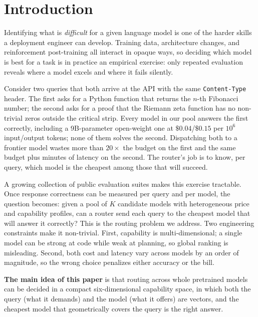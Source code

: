 \documentclass[twocolumn,10pt,a4paper]{article}
\begin{document}
\section{Introduction}\label{sec:intro}
Identifying what is \emph{difficult} for a given language model is one of the harder skills a deployment engineer can develop. Training data, architecture changes, and reinforcement post-training all interact in opaque ways, so deciding which model is best for a task is in practice an empirical exercise: only repeated evaluation reveals where a model excels and where it fails silently.

Consider two queries that both arrive at the API with the same \texttt{Content-Type} header. The first asks for a Python function that returns the $n$-th Fibonacci number; the second asks for a proof that the Riemann zeta function has no non-trivial zeros outside the critical strip. Every model in our pool answers the first correctly, including a 9B-parameter open-weight one at $\$0.04$/$\$0.15$ per $10^6$ input/output tokens; none of them solves the second. Dispatching both to a frontier model wastes more than $20{\times}$ the budget on the first and the same budget plus minutes of latency on the second. The router's job is to know, per query, which model is the cheapest among those that will succeed.

A growing collection of public evaluation suites makes this exercise tractable. Once response correctness can be measured per query and per model, the question becomes: given a pool of $K$ candidate models with heterogeneous price and capability profiles, can a router send each query to the cheapest model that will answer it correctly? This is the routing problem we address. Two engineering constraints make it non-trivial. First, capability is multi-dimensional; a single model can be strong at code while weak at planning, so global ranking is misleading. Second, both cost and latency vary across models by an order of magnitude, so the wrong choice penalizes either accuracy or the bill.

\textbf{The main idea of this paper} is that routing across whole pretrained models can be decided in a compact six-dimensional capability space, in which both the query (what it demands) and the model (what it offers) are vectors, and the cheapest model that geometrically covers the query is the right answer.
\end{document}
